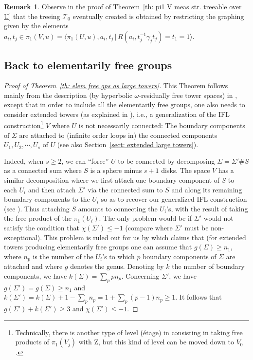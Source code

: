 \documentclass[11pt]{amsart}
\theoremstyle{definition}
\newtheorem{remark}[definition]{Remark}
\theoremstyle{plain}
\newcommand{\<}{\langle}
\renewcommand{\>}{\rangle}
\newcommand{\Z}{\bm{\mathrm{Z}}}
\newcommand\TT{\mathcal{T}}
\begin{document}
\begin{remark}
Observe in the proof of Theorem~\ref{th: pi1 V meas str. treeable over U} that the treeing $\TT_0$ eventually created is obtained by restricting the graphing given by the elements   $a_i,t_j\in \pi_1(V,u)=\langle \pi_1(U,u), a_i,t_j \,\vert\,  R(a_i,t_j^{-1}\gamma_j t_j)= t_1=1 \rangle$.

\end{remark}


\subsection{Back to elementarily free groups}
\label{sect: back to elementarily free groups}


\begin{proof}[Proof of Theorem~\ref{th: elem free gps as large towers}]
This Theorem follows mainly from the description (by hyperbolic $\omega$-residually free tower spaces) in \cite[Proposition 6]{SeVI}, except that in order to include all the elementarily free groups, one also needs to consider extended towers (as explained in \cite[Section 10.3, Definition 4.26, Corollary 7.10.5]{Guirardel-Levitt-Sklinos-2020}), i.e., a generalization of the IFL construction\footnote{Technically, there is another type of level (étage) in \cite{Guirardel-Levitt-Sklinos-2020} consisting in taking free products of $\pi_1(V_j)$ with $\Z$, but this kind of level can be moved down to $V_0$.}
 $V$ where $U$ is not necessarily connected:
The boundary components of $\Sigma$  are attached to (infinite order loops in) the connected components $U_1, U_2, \cdots, U_s$ of $U$
(see also Section~\ref{sect: extended large towers}).

Indeed,
 when $s\geq 2$, we can ``force'' $U$ to be connected by decomposing $\Sigma=\Sigma'\# S$ as a connected sum where $S$ is a sphere minus $s+1$ disks.
The space $V$ has a similar decomposition where we first attach one boundary component of $S$ to each $U_i$ and then attach
$\Sigma'$ via the connected sum to $S$ and along its remaining boundary components to the $U_i$ so as to recover our generalized IFL construction
(see \cite[Proposition 5.1 and its pictures]{Guirardel-Levitt-Sklinos-2020}).
Thus attaching $S$ amounts to connecting the $U_i$'s, with the result of taking the free product of the $\pi_1(U_i)$. The only problem would be if $\Sigma'$ would not satisfy the condition that $\chi(\Sigma')\leq -1$ (compare \cite[Remark 10.3]{Guirardel-Levitt-Sklinos-2020}
 where $\Sigma'$ must be non-exceptional).
This problem is ruled out for us by \cite[Remark 4.25]{Guirardel-Levitt-Sklinos-2020} which claims that (for extended towers producing elementarily free groups one can assume that
$g(\Sigma)\geq n_1$,
where $n_p$ is the number of the $U_i$'s to which $p$ boundary components of $\Sigma$ are attached and where $g$ denotes the genus.
Denoting by $k$ the number of boundary components, we have $k(\Sigma)=\sum_p p n_p$.
Concerning $\Sigma'$, we have
$g(\Sigma')=g(\Sigma)\geq n_1$ and $k(\Sigma')=k(\Sigma)+1-\sum_p n_p=1+\sum_p(p-1)n_p\geq 1$. It follows that $g(\Sigma')+k(\Sigma')\geq 3$ and $\chi(\Sigma')\leq -1$.
\end{proof}
\end{document}
